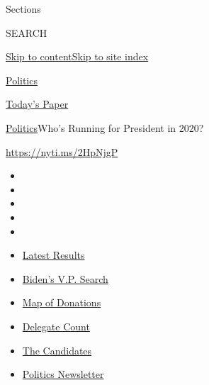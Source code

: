 Sections

SEARCH

\protect\hyperlink{site-content}{Skip to
content}\protect\hyperlink{site-index}{Skip to site index}

\href{https://www.nytimes3xbfgragh.onion/section/politics}{Politics}

\href{https://myaccount.nytimes3xbfgragh.onion/auth/login?response_type=cookie\&client_id=vi}{}

\href{https://www.nytimes3xbfgragh.onion/section/todayspaper}{Today's
Paper}

\href{/section/politics}{Politics}\textbar{}Who's Running for President
in 2020?

\href{https://nyti.ms/2HpNjgP}{https://nyti.ms/2HpNjgP}

\begin{itemize}
\item
\item
\item
\item
\item
\end{itemize}

\begin{itemize}
\item
  \href{https://www.nytimes3xbfgragh.onion/interactive/2020/08/04/us/elections/results-arizona-kansas-michigan-missouri-primaries.html?action=click\&pgtype=Article\&state=default\&region=TOP_BANNER\&context=storylines_menu}{Latest
  Results}
\item
  \href{https://www.nytimes3xbfgragh.onion/article/biden-vice-president-2020.html?action=click\&pgtype=Article\&state=default\&region=TOP_BANNER\&context=storylines_menu}{Biden's
  V.P. Search}
\item
  \href{https://www.nytimes3xbfgragh.onion/interactive/2020/07/24/us/politics/trump-biden-campaign-donors.html?action=click\&pgtype=Article\&state=default\&region=TOP_BANNER\&context=storylines_menu}{Map
  of Donations}
\item
  \href{https://www.nytimes3xbfgragh.onion/interactive/2020/us/elections/delegate-count-primary-results.html?action=click\&pgtype=Article\&state=default\&region=TOP_BANNER\&context=storylines_menu}{Delegate
  Count}
\item
  \href{https://www.nytimes3xbfgragh.onion/interactive/2019/us/politics/2020-presidential-candidates.html?action=click\&pgtype=Article\&state=default\&region=TOP_BANNER\&context=storylines_menu}{The
  Candidates}
\item
  \href{https://www.nytimes3xbfgragh.onion/newsletters/politics?action=click\&pgtype=Article\&state=default\&region=TOP_BANNER\&context=storylines_menu}{Politics
  Newsletter}
\end{itemize}

